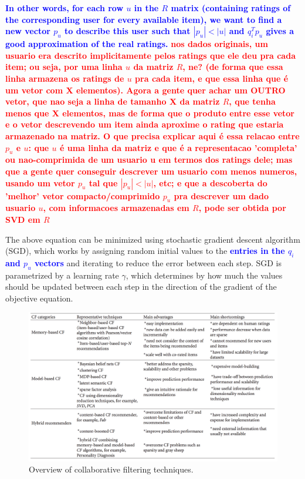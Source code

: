 \documentclass[cic,tc,english]{iiufrgs}
\newcommand{\bruno}[1]{\textcolor{red}{\textbf{#1}}}
\newcommand{\adriano}[1]{\textcolor{blue}{\textbf{#1}}}
\begin{document}
\adriano{In other words, for each row $u$ in the $R$ matrix (containing ratings of the corresponding user for every available item), we want to find a new vector $p_u$ to describe this user such that $|p_u| < |u|$ and $q_i^Tp_u$ gives a good approximation of the real ratings. }
\bruno{nos dados originais, um usuario era descrito implicitamente pelos ratings que ele deu pra cada item; ou seja, por uma linha $u$ da matriz $R$, ne? (de forma que essa linha armazena os ratings de $u$ pra cada item, e que essa linha que é um vetor com X elementos). Agora a gente quer achar um OUTRO vetor, que nao seja a linha de tamanho X da matriz $R$, que tenha menos que X elementos, mas de forma que o produto entre esse vetor e o vetor descrevendo um item ainda aproxime o rating que estaria armazenado na matriz. O que precisa explicar aqui é essa relacao entre $p_u$ e $u$: que $u$ é uma linha da matriz e que é a representacao 'completa' ou nao-comprimida de um usuario u em termos dos ratings dele; mas que a gente quer conseguir descrever um usuario com menos numeros, usando um vetor $p_u$ tal que $|p_u| < |u|$, etc; e que a descoberta do 'melhor' vetor compacto/comprimido $p_u$ pra descrever um dado usuario $u$, com informacoes armazenadas em $R$, pode ser obtida por SVD em $R$}

The above equation can be minimized using stochastic gradient descent algorithm (SGD), which works by assigning random initial values to the \adriano{entries in the $q_i$ and $p_u$ vectors } and iterating to reduce the error between each step. SGD is parametrized by a learning rate $\gamma$, which determines by how much the values should be updated between each step in the direction of the gradient of the objective equation.

\begin{figure}[ht!]
    \caption{Overview of collaborative filtering techniques.}
    \begin{center}
        \includegraphics[width=35em]{cf-comparison}
    \end{center}
    \label{fig:cf-comparison}
\end{figure}
\end{document}
